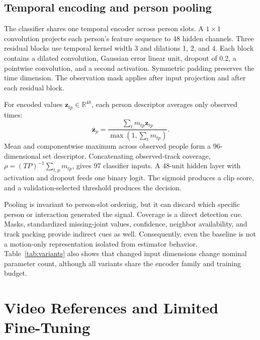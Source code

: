 \documentclass[journal]{IEEEtai}
\newcommand{\R}{\mathbb{R}}
\begin{document}
\subsection{Temporal encoding and person pooling}
The classifier shares one temporal encoder across person slots. A $1\times1$ convolution projects each person's feature sequence to 48 hidden channels. Three residual blocks use temporal kernel width 3 and dilations 1, 2, and 4. Each block contains a dilated convolution, Gaussian error linear unit, dropout of 0.2, a pointwise convolution, and a second activation. Symmetric padding preserves the time dimension. The observation mask applies after input projection and after each residual block.

For encoded values $\mathbf{z}_{tp}\in\R^{48}$, each person descriptor averages only observed times:
\begin{equation}
\overline{\mathbf{z}}_p=
\frac{\sum_t m_{tp}\mathbf{z}_{tp}}
{\max(1,\sum_t m_{tp})}.
\end{equation}
Mean and componentwise maximum across observed people form a 96-dimensional set descriptor. Concatenating observed-track coverage, $\rho=(TP)^{-1}\sum_{t,p}m_{tp}$, gives 97 classifier inputs. A 48-unit hidden layer with activation and dropout feeds one binary logit. The sigmoid produces a clip score, and a validation-selected threshold produces the decision.

Pooling is invariant to person-slot ordering, but it can discard which specific person or interaction generated the signal. Coverage is a direct detection cue. Masks, standardized missing-joint values, confidence, neighbor availability, and track packing provide indirect cues as well. Consequently, even the baseline is not a motion-only representation isolated from estimator behavior. Table~\ref{tab:variants} also shows that changed input dimensions change nominal parameter count, although all variants share the encoder family and training budget.



\section{Video References and Limited Fine-Tuning}
\end{document}
